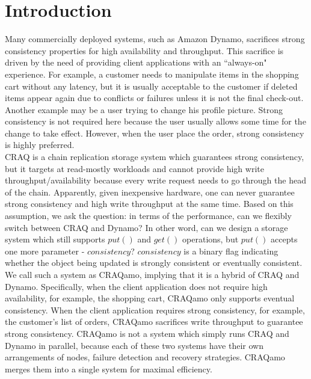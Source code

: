 \section{Introduction}
\label{sec:intro}

Many commercially deployed systems, such as Amazon Dynamo\cite{decandia2007dynamo}, sacrifices strong consistency properties for high availability and throughput. This sacrifice is driven by the need of providing client applications with an ``always-on" experience. For example, a customer needs to manipulate items in the shopping cart without any latency, but it is usually acceptable to the customer if deleted items appear again due to conflicts or failures unless it is not the final check-out. Another example may be a user trying to change his profile picture. Strong consistency is not required here because the user usually allows some time for the change to take effect. However, when the user place the order, strong consistency is highly preferred. \\

CRAQ\cite{terrace2009object} is a chain replication storage system which guarantees strong consistency, but it targets at read-mostly workloads and cannot provide high write throughput/availability because every write request needs to go through the head of the chain. Apparently, given inexpensive hardware, one can never guarantee strong consistency and high write throughput at the same time. Based on this assumption, we ask the question: in terms of the performance, can we flexibly switch between CRAQ and Dynamo? In other word, can we design a storage system which still supports $put()$ and $get()$ operations, but $put()$ accepts one more parameter - $consistency$? $consistency$ is a binary flag indicating whether the object being updated is strongly consistent or eventually consistent. \\

We call such a system as CRAQamo, implying that it is a hybrid of CRAQ and Dynamo. Specifically, when the client application does not require high availability, for example, the shopping cart, CRAQamo only supports eventual consistency. When the client application requires strong consistency, for example, the customer's list of orders, CRAQamo sacrifices write throughput to guarantee strong consistency. CRAQamo is not a system which simply runs CRAQ and Dynamo in parallel, because each of these two systems have their own arrangements of nodes, failure detection and recovery strategies. CRAQamo merges them into a single system for maximal efficiency.

